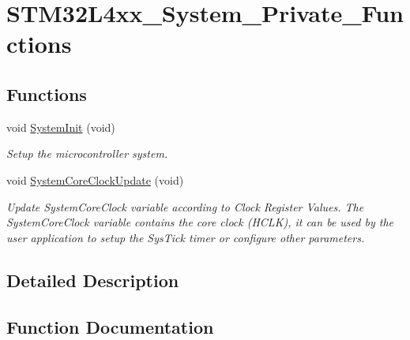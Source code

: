\hypertarget{group___s_t_m32_l4xx___system___private___functions}{}\section{S\+T\+M32\+L4xx\+\_\+\+System\+\_\+\+Private\+\_\+\+Functions}
\label{group___s_t_m32_l4xx___system___private___functions}
\subsection*{Functions}
\begin{DoxyCompactItemize}
\item 
void \hyperlink{group___s_t_m32_l4xx___system___private___functions_ga93f514700ccf00d08dbdcff7f1224eb2}{System\+Init} (void)
\begin{DoxyCompactList}\small\item\em Setup the microcontroller system. \end{DoxyCompactList}\item 
void \hyperlink{group___s_t_m32_l4xx___system___private___functions_gae0c36a9591fe6e9c45ecb21a794f0f0f}{System\+Core\+Clock\+Update} (void)
\begin{DoxyCompactList}\small\item\em Update System\+Core\+Clock variable according to Clock Register Values. The System\+Core\+Clock variable contains the core clock (H\+C\+LK), it can be used by the user application to setup the Sys\+Tick timer or configure other parameters. \end{DoxyCompactList}\end{DoxyCompactItemize}


\subsection{Detailed Description}


\subsection{Function Documentation}
\mbox{\label{group___s_t_m32_l4xx___system___private___functions_gae0c36a9591fe6e9c45ecb21a794f0f0f}} 
